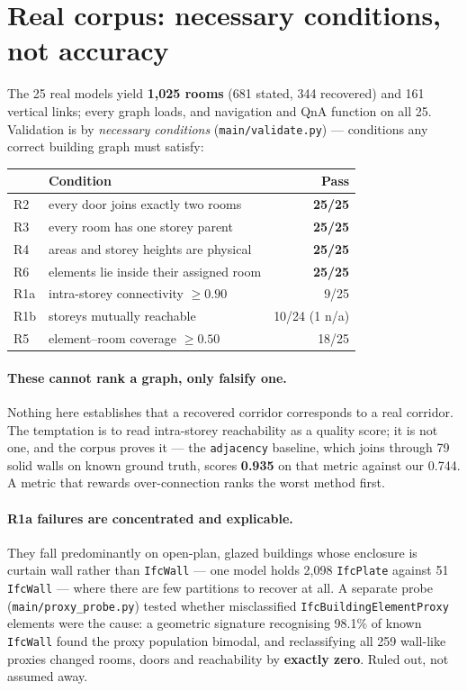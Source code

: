 \documentclass[11pt,a4paper]{article}
\begin{document}
\section{Real corpus: necessary conditions, not accuracy}

The 25 real models yield \textbf{1{,}025 rooms} (681 stated, 344 recovered) and
161 vertical links; every graph loads, and navigation and QnA function on all
25. Validation is by \emph{necessary conditions} (\texttt{main/validate.py}) ---
conditions any correct building graph must satisfy:

\begin{center}
\small
\begin{tabular}{llr}
\toprule
& \textbf{Condition} & \textbf{Pass} \\
\midrule
R2 & every door joins exactly two rooms      & \textbf{25/25} \\
R3 & every room has one storey parent        & \textbf{25/25} \\
R4 & areas and storey heights are physical   & \textbf{25/25} \\
R6 & elements lie inside their assigned room & \textbf{25/25} \\
\addlinespace
R1a & intra-storey connectivity $\geq 0.90$  & 9/25 \\
R1b & storeys mutually reachable             & 10/24 (1 n/a) \\
R5 & element--room coverage $\geq 0.50$      & 18/25 \\
\bottomrule
\end{tabular}
\end{center}

\paragraph{These cannot rank a graph, only falsify one.} Nothing here
establishes that a recovered corridor corresponds to a real corridor. The
temptation is to read intra-storey reachability as a quality score; it is not
one, and the corpus proves it --- the \texttt{adjacency} baseline, which joins
through 79 solid walls on known ground truth, scores \textbf{0.935} on that
metric against our 0.744. A metric that rewards over-connection ranks the worst
method first.

\paragraph{R1a failures are concentrated and explicable.} They fall
predominantly on open-plan, glazed buildings whose enclosure is curtain wall
rather than \texttt{IfcWall} --- one model holds 2{,}098 \texttt{IfcPlate}
against 51 \texttt{IfcWall} --- where there are few partitions to recover at
all. A separate probe (\texttt{main/proxy\_probe.py}) tested whether
misclassified \texttt{IfcBuildingElementProxy} elements were the cause: a
geometric signature recognising 98.1\% of known \texttt{IfcWall} found the proxy
population bimodal, and reclassifying all 259 wall-like proxies changed rooms,
doors and reachability by \textbf{exactly zero}. Ruled out, not assumed away.
\end{document}
